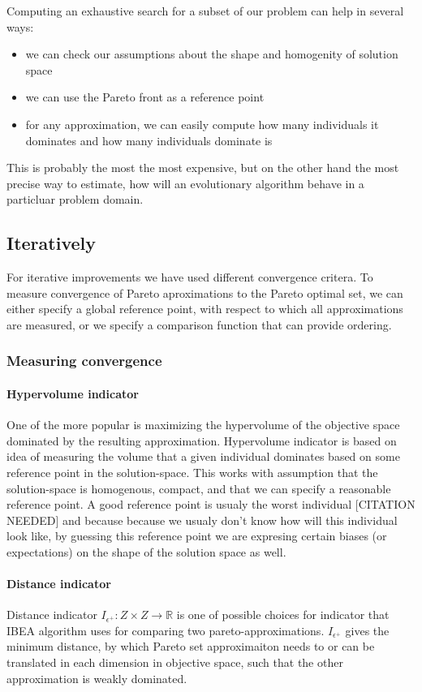 \documentclass[12pt,oneside,draft]{fithesis2}
\begin{document}
Computing an exhaustive search for a subset of our problem can help in several ways:
\begin{itemize}
  \item we can check our assumptions about the shape and homogenity of solution space
  \item we can use the Pareto front as a reference point
  \item for any approximation, we can easily compute how many individuals it dominates and how many individuals dominate is
\end{itemize}

This is probably the most the most expensive, but on the other hand the most precise way to estimate, how will an evolutionary algorithm behave in a particluar problem domain.


\subsection{Iteratively}

For iterative improvements we have used different convergence critera. To measure convergence of Pareto aproximations to the Pareto optimal set, we can either specify a global reference point, with respect to which all approximations are measured, or we specify a comparison function that can provide ordering.

\subsubsection{Measuring convergence}

\paragraph{Hypervolume indicator}
One of the more popular is maximizing the hypervolume of the objective space dominated by the resulting approximation. Hypervolume indicator is based on idea of measuring the volume that a given individual dominates based on some reference point in the solution-space. This works with assumption that the solution-space is homogenous, compact, and that we can specify a reasonable reference point. A good reference point is usualy the worst individual [CITATION NEEDED] and because because we usualy don't know how will this individual look like, by guessing this reference point we are expresing certain biases (or expectations) on the shape of the solution space as well.

\paragraph{Distance indicator}
Distance indicator $I_{\epsilon^{+}}: Z \times Z \to  \mathbb{R}$ is one of possible choices for indicator that IBEA algorithm uses for comparing two pareto-approximations. $I_{\epsilon^{+}}$ gives the minimum distance, by which Pareto set approximaiton needs to or can be translated in each dimension in objective space, such that the other approximation is weakly dominated.
\end{document}
